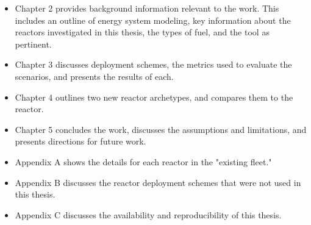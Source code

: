 \begin{itemize}
    \item Chapter 2 provides background information relevant to the work. This includes an outline of energy system modeling, key information about the reactors investigated in this thesis, the types of fuel, and the \cyclus tool as pertinent.
    \item Chapter 3 discusses deployment schemes, the metrics used to evaluate the scenarios, and presents the results of each.
    \item Chapter 4 outlines two new reactor archetypes, and compares them to the \cycamore reactor.
    \item Chapter 5 concludes the work, discusses the assumptions and limitations, and presents directions for future work.
    \item Appendix A shows the details for each reactor in the "existing fleet."
    \item Appendix B discusses the reactor deployment schemes that were not used in this thesis.
    \item Appendix C discusses the availability and reproducibility of this thesis.
\end{itemize}